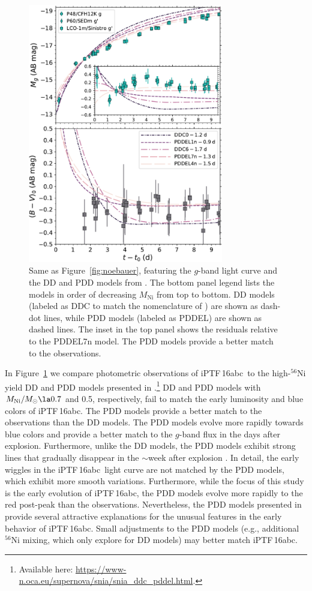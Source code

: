 \documentclass[twocolumn]{aastex61}
\newcommand{\abc}{iPTF\,16abc}
\begin{document}
\begin{figure}[]
  \centering
  \includegraphics[width=3.35in]{compare_Dessart.pdf}
  \caption{
  Same as Figure~\ref{fig:noebauer}, featuring the $g$-band light
  curve and the DD and PDD models from \citet{2014MNRAS.441..532D}. The bottom
  panel legend lists the models in order of decreasing $M_\mathrm{Ni}$ from
  top to bottom. DD models (labeled as DDC to match the nomenclature of
  \citealt{2014MNRAS.441..532D}) are shown as dash-dot lines, while PDD models
  (labeled as PDDEL) are shown as dashed lines. The inset in the top panel
  shows the residuals relative to the PDDEL7n model. The PDD models provide a
  better match to the observations.}
  \label{fig:dessart} 
\end{figure}

In Figure~\ref{fig:dessart} we compare photometric observations of
\abc\ to the high-$^{56}$Ni yield DD and PDD models presented in
\citet{2014MNRAS.441..532D}.\footnote{Available here:
\url{https://www-n.oca.eu/supernova/snia/snia_ddc_pddel.html}.} DD and PDD
models with $M_\mathrm{Ni}/M_\odot \la 0.7$ and 0.5, respectively, fail to
match the early luminosity and blue colors of \abc. The PDD models provide a
better match to the observations than the DD models. The PDD models evolve
more rapidly towards blue colors and provide a better match to the $g$-band
flux in the days after explosion. Furthermore, unlike the DD models, the PDD
models exhibit strong  lines that gradually disappear in the
$\sim$week after explosion \citep{2014MNRAS.441..532D}. In detail, the early
wiggles in the \abc\ light curve are not matched by the PDD models, which
exhibit more smooth variations. Furthermore, while the focus of this study is
the early evolution of \abc, the PDD models evolve more rapidly to the red
post-peak than the observations. Nevertheless, the PDD models presented in
\citet{2014MNRAS.441..532D} provide several attractive explanations for the
unusual features in the early behavior of \abc. Small adjustments to the PDD
models (e.g., additional $^{56}$Ni mixing, which
\citeauthor{2014MNRAS.441..532D} only explore for DD models) may better match
\abc.
\end{document}
